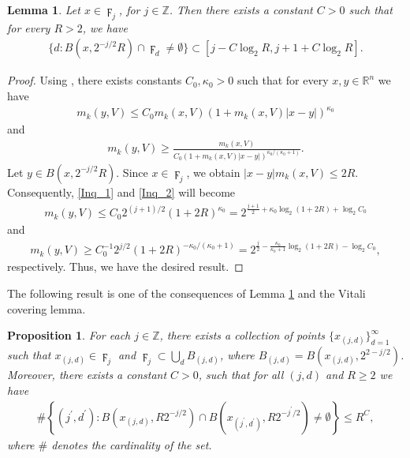 \documentclass[11pt, reqno]{amsproc}
\newtheorem{lemma}[theorem]{Lemma}
\newtheorem{proposition}[theorem]{Proposition}
\theoremstyle{definition}
\theoremstyle{remark}
\numberwithin{equation}{section}
\begin{document}
\begin{lemma}\label{Lemma_1}
Let $x \in \digamma_j$, for $j \in \mathbb{Z}$. Then there exists a constant $C>0$ such that for every $R>2$, we have 
\begin{align*}
    \{d: B(x, 2^{-j/2}R)\cap \digamma_d \neq \emptyset\} \subset [j-C\log_2R, j+1+C\log_2R].
\end{align*}
\end{lemma}
\begin{proof}
    Using \cite[Lemma 8]{Hejna-2021}, there exists constants $C_0, \kappa_0>0$ such that for every $x,y\in \mathbb{R}^n$ we have 
    \begin{align}
        m_k(y,V) \leq C_0 m_k(x,V) \left( 1+ m_k(x,V)|x-y|\right)^{\kappa_0}  \label{Inq_1}
    \end{align} and 
    \begin{align}
        m_k(y,V) \geq \frac{m_k(x,V)}{C_0\left( 1+ m_k(x,V)|x-y|\right)^{\kappa_0/(\kappa_0+1)} }. \label{Inq_2}
    \end{align} Let $y \in  B(x, 2^{-j/2}R)$. Since $x\in \digamma_j$, we obtain $|x-y|m_k(x, V)\leq 2R$.  
    Consequently, \eqref{Inq_1} and \eqref{Inq_2} will become
    \begin{align*}
        m_k(y, V) \leq C_0 2^{(j+1)/2} (1+ 2R)^{\kappa_0}= 2^{\frac{j+1}{2}+\kappa_0\log_2(1+2R)+ \log_2C_0} 
    \end{align*} and 
    \begin{align*}
        m_k(y, V) \geq C_0^{-1} 2^{j/2}(1+2R)^{-\kappa_0/(\kappa_0+1)}=2^{\frac{j}{2}-\frac{\kappa_0}{\kappa_0+1}\log_2(1+2R)-\log_2C_0 },
    \end{align*}respectively. Thus, we have the desired result.
\end{proof}
The following result is one of the consequences of Lemma \ref{Lemma_1} and the Vitali covering lemma. 

\begin{proposition} \label{cover_1}
    For each $j\in \mathbb{Z}$, there exists a collection of points $\{x_{(j,d)}\}_{d=1}^\infty$ such that $x_{(j,d)}\in \digamma_j$ and $\digamma_j \subset \bigcup_d B_{(j,d)}$, where $B_{(j,d)}=B(x_{(j,d)}, 2^{2-j/2})$. Moreover, there exists a constant $C>0$,   such that for all $(j, d)$ and $R \geq 2$ we have 
    \begin{align*}
        \# \left \{ (j^\prime, d^\prime):  B(x_{(j,d)}, R2^{-j/2}) \cap B(x_{(j^\prime, d^\prime)}, R2^{-j^\prime/2}) \neq \emptyset \right \} \leq R^C,
    \end{align*} where $\#$ denotes the cardinality of the set.
\end{proposition}
\end{document}
